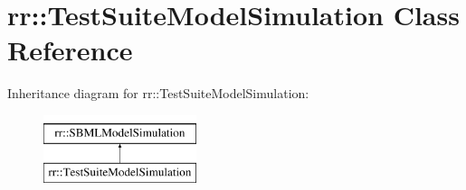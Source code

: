 \hypertarget{classrr_1_1_test_suite_model_simulation}{\section{rr\-:\-:Test\-Suite\-Model\-Simulation Class Reference}
\label{classrr_1_1_test_suite_model_simulation}
}
Inheritance diagram for rr\-:\-:Test\-Suite\-Model\-Simulation\-:\begin{figure}[H]
\begin{center}
\leavevmode
\includegraphics[height=2.000000cm]{classrr_1_1_test_suite_model_simulation}
\end{center}
\end{figure}
